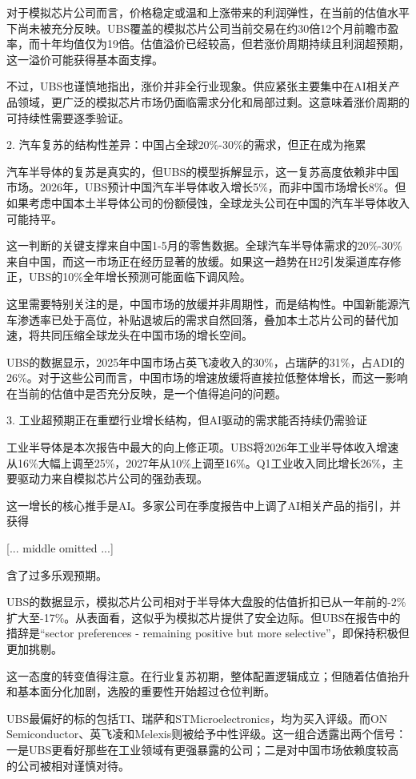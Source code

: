 \documentclass[11pt]{ctexart}
\begin{document}
对于模拟芯片公司而言，价格稳定或温和上涨带来的利润弹性，在当前的估值水平下尚未被充分反映。UBS覆盖的模拟芯片公司当前交易在约30倍12个月前瞻市盈率，而十年均值仅为19倍。估值溢价已经较高，但若涨价周期持续且利润超预期，这一溢价可能获得基本面支撑。

不过，UBS也谨慎地指出，涨价并非全行业现象。供应紧张主要集中在AI相关产品领域，更广泛的模拟芯片市场仍面临需求分化和局部过剩。这意味着涨价周期的可持续性需要逐季验证。

2. 汽车复苏的结构性差异：中国占全球20\%-30\%的需求，但正在成为拖累

汽车半导体的复苏是真实的，但UBS的模型拆解显示，这一复苏高度依赖非中国市场。2026年，UBS预计中国汽车半导体收入增长5\%，而非中国市场增长8\%。但如果考虑中国本土半导体公司的份额侵蚀，全球龙头公司在中国的汽车半导体收入可能持平。

这一判断的关键支撑来自中国1-5月的零售数据。全球汽车半导体需求的20\%-30\%来自中国，而这一市场正在经历显著的放缓。如果这一趋势在H2引发渠道库存修正，UBS的10\%全年增长预测可能面临下调风险。

这里需要特别关注的是，中国市场的放缓并非周期性，而是结构性。中国新能源汽车渗透率已处于高位，补贴退坡后的需求自然回落，叠加本土芯片公司的替代加速，将共同压缩全球龙头在中国市场的增长空间。

UBS的数据显示，2025年中国市场占英飞凌收入的30\%，占瑞萨的31\%，占ADI的26\%。对于这些公司而言，中国市场的增速放缓将直接拉低整体增长，而这一影响在当前的估值中是否充分反映，是一个值得追问的问题。

3. 工业超预期正在重塑行业增长结构，但AI驱动的需求能否持续仍需验证

工业半导体是本次报告中最大的向上修正项。UBS将2026年工业半导体收入增速从16\%大幅上调至25\%，2027年从10\%上调至16\%。Q1工业收入同比增长26\%，主要驱动力来自模拟芯片公司的强劲表现。

这一增长的核心推手是AI。多家公司在季度报告中上调了AI相关产品的指引，并获得

[... middle omitted ...]

含了过多乐观预期。

UBS的数据显示，模拟芯片公司相对于半导体大盘股的估值折扣已从一年前的-2\%扩大至-17\%。从表面看，这似乎为模拟芯片提供了安全边际。但UBS在报告中的措辞是“sector preferences - remaining positive but more selective”，即保持积极但更加挑剔。

这一态度的转变值得注意。在行业复苏初期，整体配置逻辑成立；但随着估值抬升和基本面分化加剧，选股的重要性开始超过仓位判断。

UBS最偏好的标的包括TI、瑞萨和STMicroelectronics，均为买入评级。而ON Semiconductor、英飞凌和Melexis则被给予中性评级。这一组合透露出两个信号：一是UBS更看好那些在工业领域有更强暴露的公司；二是对中国市场依赖度较高的公司被相对谨慎对待。
\end{document}
